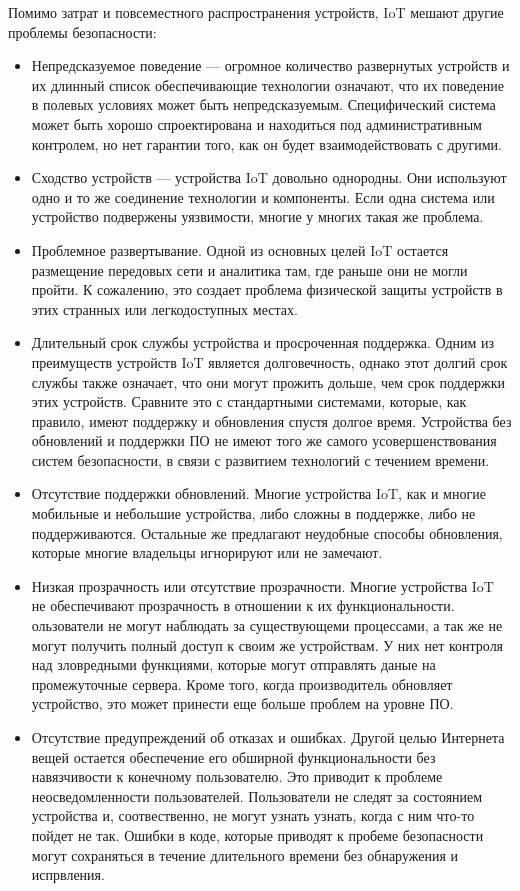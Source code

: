 Помимо затрат и повсеместного распространения устройств, IoT мешают другие проблемы безопасности:
\begin{itemize}
    \item Непредсказуемое поведение — огромное количество развернутых устройств и их длинный список
    обеспечивающие технологии означают, что их поведение в полевых условиях может быть непредсказуемым. Специфический
    система может быть хорошо спроектирована и находиться под административным контролем, но нет
    гарантии того, как он будет взаимодействовать с другими.

    \item Сходство устройств — устройства IoT довольно однородны. Они используют одно и то же соединение
    технологии и компоненты. Если одна система или устройство подвержены уязвимости, многие
    у многих такая же проблема.

    \item Проблемное развертывание. Одной из основных целей IoT остается размещение передовых
    сети и аналитика там, где раньше они не могли пройти. К сожалению, это создает
    проблема физической защиты устройств в этих странных или легкодоступных местах.
    
    \item Длительный срок службы устройства и просроченная поддержка. Одним из преимуществ устройств IoT является
    долговечность, однако этот долгий срок службы также означает, что они могут прожить дольше, чем срок поддержки этих устройств.
    Сравните это с стандартными системами, которые, как правило, имеют поддержку и обновления спустя долгое время.
    Устройства без обновлений и поддержки ПО не имеют того же самого
    усовершенствования систем безопасности, в связи с развитием технологий с течением времени.
    
    \item Отсутствие поддержки обновлений. Многие устройства IoT, как и многие мобильные и небольшие устройства, либо сложны в поддержке, либо не поддерживаются.
    Остальные же предлагают неудобные способы обновления, которые многие владельцы игнорируют или не замечают.
    
    \item Низкая прозрачность или отсутствие прозрачности. Многие устройства IoT не обеспечивают прозрачность в отношении
    к их функциональности. ользователи не могут наблюдать за существующеми процессами, а так же не могут получить полный доступ к своим же устройствам. У них нет контроля над зловредными функциями, которые могут отправлять даные на промежуточные сервера. Кроме того, когда производитель обновляет устройство, это может принести еще больше
    проблем на уровне ПО.
    
    \item Отсутствие предупреждений об отказах и ошибках. Другой целью Интернета вещей остается обеспечение его обширной функциональности без навязчивости к конечному пользователю. Это приводит к проблеме неосведомленности пользователей. Пользователи не следят за состоянием
    устройства и, соотвественно, не могут узнать узнать, когда с ним что-то пойдет не так. Ошибки в коде, которые приводят к пробеме безопасности могут сохраняться в течение длительного времени без обнаружения и испрвления.
\end{itemize}